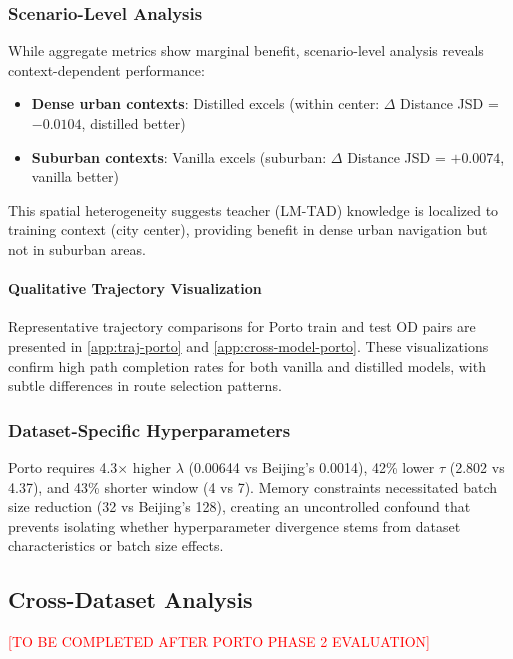 \subsubsection{Scenario-Level Analysis}

While aggregate metrics show marginal benefit, scenario-level analysis reveals context-dependent performance:
\begin{itemize}[leftmargin=*,noitemsep]
    \item \textbf{Dense urban contexts}: Distilled excels (within center: $\Delta$ Distance JSD = $-0.0104$, distilled better)
    \item \textbf{Suburban contexts}: Vanilla excels (suburban: $\Delta$ Distance JSD = $+0.0074$, vanilla better)
\end{itemize}

This spatial heterogeneity suggests teacher (LM-TAD) knowledge is localized to training context (city center), providing benefit in dense urban navigation but not in suburban areas.

\paragraph{Qualitative Trajectory Visualization}
Representative trajectory comparisons for Porto train and test OD pairs are presented in \autoref{app:traj-porto} and \autoref{app:cross-model-porto}. These visualizations confirm high path completion rates for both vanilla and distilled models, with subtle differences in route selection patterns.

\subsubsection{Dataset-Specific Hyperparameters}

Porto requires 4.3$\times$ higher $\lambda$ (0.00644 vs Beijing's 0.0014), 42\% lower $\tau$ (2.802 vs 4.37), and 43\% shorter window (4 vs 7). Memory constraints necessitated batch size reduction (32 vs Beijing's 128), creating an uncontrolled confound that prevents isolating whether hyperparameter divergence stems from dataset characteristics or batch size effects.

\subsection{Cross-Dataset Analysis}
\label{sec:eval-cross}

\textcolor{red}{[TO BE COMPLETED AFTER PORTO PHASE 2 EVALUATION]}

